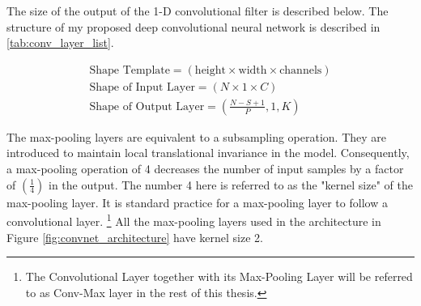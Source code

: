 The size of the output of the 1-D convolutional filter is described below.
 The structure of my proposed deep convolutional neural network is described in \ref{tab:conv_layer_list}.

\begin{gather}
\text{Shape Template} = (\text{height} \times \text{width} \times \text{channels}) \\
\text{Shape of Input Layer} = (N \times 1 \times C) \\
\text{Shape of Output Layer} = \left(\frac{N-S+1}{P}, 1, K \right)
\end{gather}

The max-pooling layers are equivalent to a subsampling operation.
 They are introduced to maintain local translational invariance in the model.
 Consequently, a max-pooling operation of 4 decreases the number of input samples by a factor of $\left(\frac{1}{4}\right)$ in the output.
 The number 4 here is referred to as the "kernel size" of the max-pooling layer.
 It is standard practice for a max-pooling layer to follow a convolutional layer.
 \footnote{The Convolutional Layer together with its Max-Pooling Layer will be referred to as Conv-Max layer in the rest of this thesis.}
 All the max-pooling layers used in the architecture in Figure \ref{fig:convnet_architecture} have kernel size 2.

